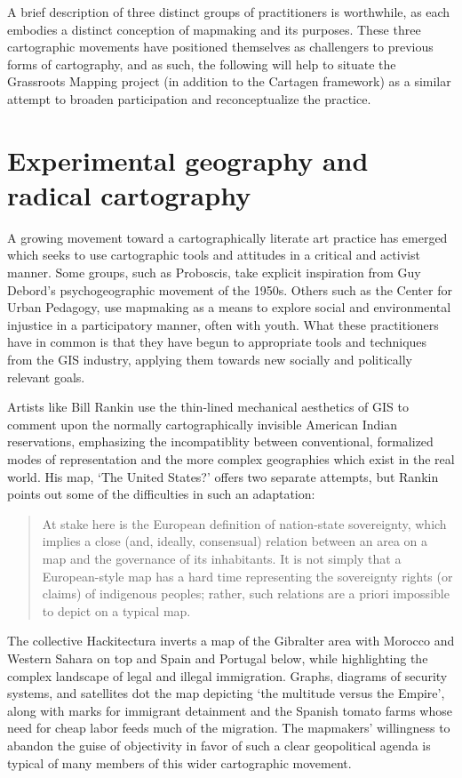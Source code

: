 \documentclass[11pt,oneside,notitlepage]{report}
\begin{document}
{{A brief description of three distinct groups of practitioners is worthwhile, as each embodies a distinct conception of mapmaking and its purposes. These three cartographic movements have positioned themselves as challengers to previous forms of cartography, and as such, the following will help to situate the Grassroots Mapping project (in addition to the Cartagen framework) as a similar attempt to broaden participation and reconceptualize the practice. 

\section{Experimental geography and radical cartography}

A growing movement toward a cartographically literate art practice has emerged which seeks to use cartographic tools and attitudes in a critical and activist manner. Some groups, such as Proboscis, take explicit inspiration from Guy Debord's psychogeographic movement of the 1950s. Others such as the Center for Urban Pedagogy, use mapmaking as a means to explore social and environmental injustice in a participatory manner, often with youth. What these practitioners have in common is that they have begun to appropriate tools and techniques from the \ac{GIS} industry, applying them towards new socially and politically relevant goals. 

Artists like Bill Rankin use the thin-lined mechanical aesthetics of \ac{GIS} to comment upon the normally cartographically invisible American Indian reservations, emphasizing the incompatiblity between conventional, formalized modes of representation and the more complex geographies which exist in the real world. His map, `The United States?' offers two separate attempts, but Rankin points out some of the difficulties in such an adaptation:

\begin{quote}
At stake here is the European definition of nation-state sovereignty, which implies a close (and, ideally, consensual) relation between an area on a map and the governance of its inhabitants. It is not simply that a European-style map has a hard time representing the sovereignty rights (or claims) of indigenous peoples; rather, such relations are a priori impossible to depict on a typical map. \cite{rankin2003reservations}
\end{quote}

The collective Hackitectura inverts a map of the Gibralter area with Morocco and Western Sahara on top and Spain and Portugal below, while highlighting the complex landscape of legal and illegal immigration. Graphs, diagrams of security systems, and satellites dot the map depicting `the multitude versus the Empire', along with marks for immigrant detainment and the Spanish tomato farms whose need for cheap labor feeds much of the migration. The mapmakers' willingness to abandon the guise of objectivity in favor of such a clear geopolitical agenda is typical of many members of this wider cartographic movement.  

}}
\end{document}
